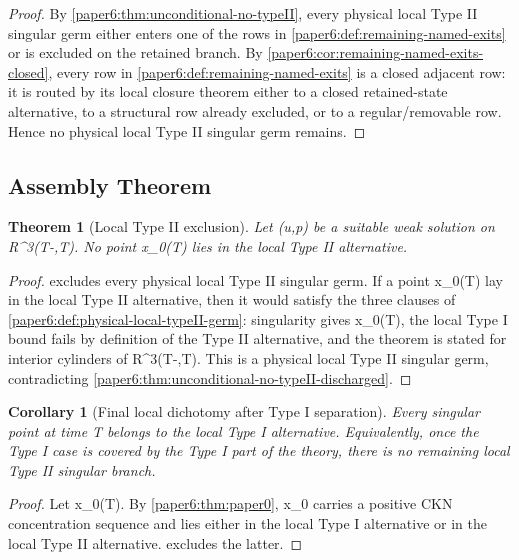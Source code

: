 \documentclass[11pt]{amsart}
\def\({}%
\def\){}%
\def\mathbb#1{#1}%
\theoremstyle{plain}
\newtheorem{theorem}{Theorem}[section]
\newtheorem{corollary}[corollary]{Corollary}
\theoremstyle{definition}
\theoremstyle{remark}
\begin{document}
\begin{proof}
By \cref{paper6:thm:unconditional-no-typeII}, every physical local Type II
singular germ either enters one of the rows in
\cref{paper6:def:remaining-named-exits} or is excluded on the retained
branch.  By \cref{paper6:cor:remaining-named-exits-closed}, every row in
\cref{paper6:def:remaining-named-exits} is a closed adjacent row: it is routed
by its local closure theorem either to a closed retained-state alternative, to
a structural row already excluded, or to a regular/removable row.  Hence no
physical local Type II singular germ remains.
\end{proof}

\subsection{Assembly Theorem}

\begin{theorem}[Local Type II exclusion]
\label{paper6:thm:local-typeII-exclusion}
Let \((u,p)\) be a suitable weak solution on
\(\mathbb R^3\times(T-\delta,T)\).  No point \(x_0\in\Sigma(T)\) lies in the
local Type II alternative.
\end{theorem}

\begin{proof}
 excludes every physical
local Type II singular germ.  If a point \(x_0\in\Sigma(T)\) lay in the local
Type II alternative, then it would satisfy the three clauses of
\cref{paper6:def:physical-local-typeII-germ}: singularity gives
\(x_0\in\Sigma(T)\), the local Type I bound fails by definition of the Type II
alternative, and the theorem is stated for interior cylinders of
\(\mathbb R^3\times(T-\delta,T)\).  This is a physical local Type II singular
germ, contradicting
\cref{paper6:thm:unconditional-no-typeII-discharged}.
\end{proof}

\begin{corollary}[Final local dichotomy after Type I separation]
\label{paper6:cor:final-local-dichotomy}
Every singular point at time \(T\) belongs to the local Type I alternative.
Equivalently, once the Type I case is covered by the Type I part of the theory,
there is no remaining local Type II singular branch.
\end{corollary}

\begin{proof}
Let \(x_0\in\Sigma(T)\).  By \cref{paper6:thm:paper0}, \(x_0\) carries a
positive CKN concentration sequence and lies either in the local Type I
alternative or in the local Type II alternative.
 excludes the latter.
\end{proof}
\end{document}
